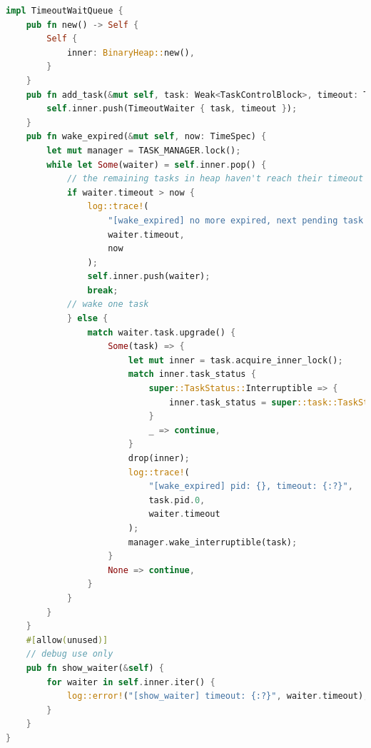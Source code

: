 \begin{lstlisting}[language=rust]
    impl TimeoutWaitQueue {
    pub fn new() -> Self {
        Self {
            inner: BinaryHeap::new(),
        }
    }
    pub fn add_task(&mut self, task: Weak<TaskControlBlock>, timeout: TimeSpec) {
        self.inner.push(TimeoutWaiter { task, timeout });
    }
    pub fn wake_expired(&mut self, now: TimeSpec) {
        let mut manager = TASK_MANAGER.lock();
        while let Some(waiter) = self.inner.pop() {
            // the remaining tasks in heap haven't reach their timeout
            if waiter.timeout > now {
                log::trace!(
                    "[wake_expired] no more expired, next pending task timeout: {:?}, now: {:?}",
                    waiter.timeout,
                    now
                );
                self.inner.push(waiter);
                break;
            // wake one task
            } else {
                match waiter.task.upgrade() {
                    Some(task) => {
                        let mut inner = task.acquire_inner_lock();
                        match inner.task_status {
                            super::TaskStatus::Interruptible => {
                                inner.task_status = super::task::TaskStatus::Ready
                            }
                            _ => continue,
                        }
                        drop(inner);
                        log::trace!(
                            "[wake_expired] pid: {}, timeout: {:?}",
                            task.pid.0,
                            waiter.timeout
                        );
                        manager.wake_interruptible(task);
                    }
                    None => continue,
                }
            }
        }
    }
    #[allow(unused)]
    // debug use only
    pub fn show_waiter(&self) {
        for waiter in self.inner.iter() {
            log::error!("[show_waiter] timeout: {:?}", waiter.timeout);
        }
    }
}
\end{lstlisting}
